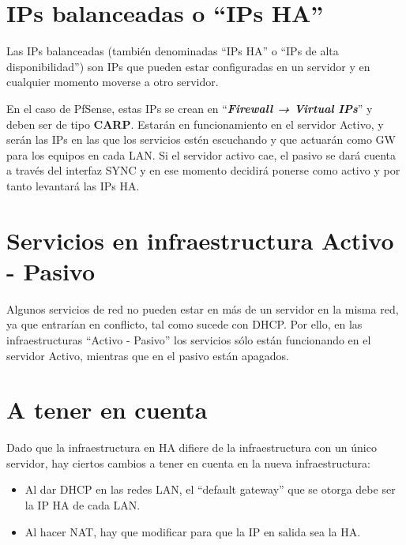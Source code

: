 \section{IPs balanceadas o “IPs HA”}
Las IPs balanceadas (también denominadas “IPs HA” o “IPs de alta disponibilidad”) son IPs que pueden estar configuradas en un servidor y en cualquier momento moverse a otro servidor.

En el caso de PfSense, estas IPs se crean en “\textbf{\textit{Firewall → Virtual IPs}}” y deben ser de tipo \textbf{CARP}. Estarán en funcionamiento en el servidor Activo, y serán las IPs en las que los servicios estén escuchando y que actuarán como GW para los equipos en cada LAN. Si el servidor activo cae, el pasivo se dará cuenta a través del interfaz SYNC y en ese momento decidirá ponerse como activo y por tanto levantará las IPs HA.


\section{Servicios en infraestructura Activo - Pasivo}
Algunos servicios de red no pueden estar en más de un servidor en la misma red, ya que entrarían en conflicto, tal como sucede con DHCP. Por ello, en las infraestructuras “Activo - Pasivo” los servicios sólo están funcionando en el servidor Activo, mientras que en el pasivo están apagados.


\section{A tener en cuenta}
Dado que la infraestructura en HA difiere de la infraestructura con un único servidor, hay ciertos cambios a tener en cuenta en la nueva infraestructura:

\begin{itemize}
    \item Al dar DHCP en las redes LAN, el “default gateway” que se otorga debe ser la IP HA de cada LAN.
    \item Al hacer NAT, hay que modificar para que la IP en salida sea la HA.
\end{itemize}

